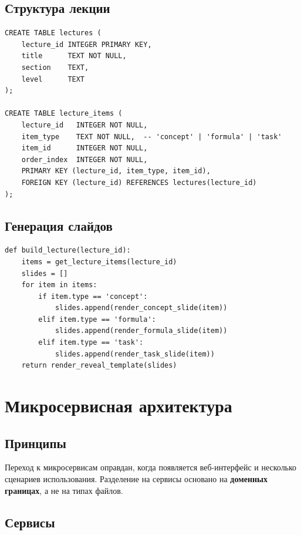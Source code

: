 \documentclass[12pt,a4paper]{article}
\begin{document}
\subsection{Структура лекции}

\begin{verbatim}
CREATE TABLE lectures (
    lecture_id INTEGER PRIMARY KEY,
    title      TEXT NOT NULL,
    section    TEXT,
    level      TEXT
);

CREATE TABLE lecture_items (
    lecture_id   INTEGER NOT NULL,
    item_type    TEXT NOT NULL,  -- 'concept' | 'formula' | 'task'
    item_id      INTEGER NOT NULL,
    order_index  INTEGER NOT NULL,
    PRIMARY KEY (lecture_id, item_type, item_id),
    FOREIGN KEY (lecture_id) REFERENCES lectures(lecture_id)
);
\end{verbatim}

\subsection{Генерация слайдов}

\begin{verbatim}
def build_lecture(lecture_id):
    items = get_lecture_items(lecture_id)
    slides = []
    for item in items:
        if item.type == 'concept':
            slides.append(render_concept_slide(item))
        elif item.type == 'formula':
            slides.append(render_formula_slide(item))
        elif item.type == 'task':
            slides.append(render_task_slide(item))
    return render_reveal_template(slides)
\end{verbatim}

\section{Микросервисная архитектура}

\subsection{Принципы}

Переход к микросервисам оправдан, когда появляется веб-интерфейс
и несколько сценариев использования. Разделение на сервисы
основано на \textbf{доменных границах}, а не на типах файлов.

\subsection{Сервисы}
\end{document}
